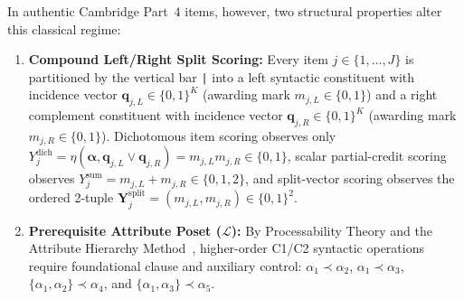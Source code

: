 \documentclass[11pt,reqno]{article}
\begin{document}
In authentic Cambridge Part~4 items, however, two structural properties alter this classical regime:
\begin{enumerate}
    \item \textbf{Compound Left/Right Split Scoring:} Every item $j \in \{1,\dots,J\}$ is partitioned by the vertical bar \texttt{|} into a left syntactic constituent with incidence vector $\mathbf{q}_{j,L} \in \{0,1\}^K$ (awarding mark $m_{j,L} \in \{0,1\}$) and a right complement constituent with incidence vector $\mathbf{q}_{j,R} \in \{0,1\}^K$ (awarding mark $m_{j,R} \in \{0,1\}$). Dichotomous item scoring observes only $Y_j^{\mathrm{dich}} = \eta(\boldsymbol{\alpha}, \mathbf{q}_{j,L} \vee \mathbf{q}_{j,R}) = m_{j,L} m_{j,R} \in \{0,1\}$, scalar partial-credit scoring observes $Y_j^{\mathrm{sum}} = m_{j,L} + m_{j,R} \in \{0,1,2\}$, and split-vector scoring observes the ordered 2-tuple $\mathbf{Y}_j^{\mathrm{split}} = (m_{j,L}, m_{j,R}) \in \{0,1\}^2$.
    \item \textbf{Prerequisite Attribute Poset ($\mathcal{L}$):} By Processability Theory and the Attribute Hierarchy Method~\cite{Leighton2004,Tatsuoka2009}, higher-order C1/C2 syntactic operations require foundational clause and auxiliary control: $\alpha_1 \prec \alpha_2$, $\alpha_1 \prec \alpha_3$, $\{\alpha_1, \alpha_2\} \prec \alpha_4$, and $\{\alpha_1, \alpha_3\} \prec \alpha_5$.
\end{enumerate}
\end{document}
